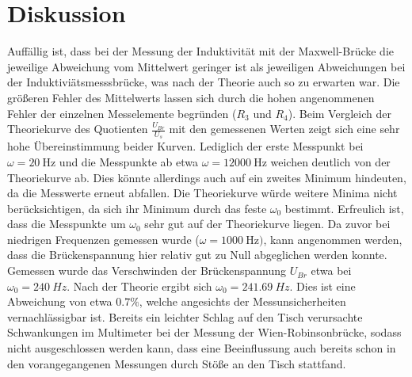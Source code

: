 \section{Diskussion}
\label{sec:Diskussion}
Auffällig ist, dass bei der Messung der Induktivität mit der Maxwell-Brücke die jeweilige Abweichung vom Mittelwert geringer ist als jeweiligen Abweichungen bei der Induktiviätsmesssbrücke, was nach der Theorie auch so zu erwarten war.
Die größeren Fehler des Mittelwerts lassen sich durch die hohen angenommenen Fehler der einzelnen Messelemente begründen ($R_3$ und $R_4$).
Beim Vergleich der Theoriekurve des Quotienten $\frac{U_{Br}}{U_s}$ mit den gemessenen Werten zeigt sich eine sehr hohe Übereinstimmung beider Kurven. Lediglich der erste Messpunkt
bei $\omega=\SI{20}{\Hz}$ und die Messpunkte ab etwa $\omega=\SI{12000}{\Hz}$ weichen deutlich von der Theoriekurve ab. Dies könnte allerdings auch auf ein zweites Minimum hindeuten, da die Messwerte erneut abfallen. Die Theoriekurve würde weitere Minima nicht berücksichtigen, da sich ihr Minimum durch das feste $\omega_0$ bestimmt.
Erfreulich ist, dass die Messpunkte um $\omega_0$ sehr gut auf der Theoriekurve liegen.
Da zuvor bei niedrigen Frequenzen gemessen wurde ($\omega=\SI{1000}{\Hz})$, kann angenommen werden, dass die Brückenspannung hier relativ gut zu Null abgeglichen werden konnte. Gemessen wurde das Verschwinden der Brückenspannung
$U_{Br}$ etwa bei $\omega_0=\SI{240}{Hz}$. Nach der Theorie ergibt sich $\omega_0=\SI{241.69}{Hz}$. Dies ist eine Abweichung von etwa $0.7\%$, welche angesichts der Messunsicherheiten vernachlässigbar ist.
Bereits ein leichter Schlag auf den Tisch verursachte Schwankungen im Multimeter bei der Messung der Wien-Robinsonbrücke, sodass nicht ausgeschlossen werden kann, dass eine Beeinflussung auch bereits schon in den vorangegangenen Messungen durch Stöße an den Tisch stattfand.
